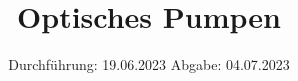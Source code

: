 

\subject{V21}
\title{Optisches Pumpen}
\date{%
  Durchführung: 19.06.2023
  \hspace{3em}
  Abgabe: 04.07.2023
}



\maketitle
\thispagestyle{empty}
\tableofcontents
\newpage
\setcounter{page}{1}



\newpage




\printbibliography{}

